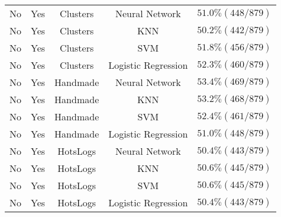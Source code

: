 \documentclass[11pt,letterpaper]{article}
\begin{document}
\begin{tabular}{c|c|c|c|c}
No & Yes & Clusters & Neural Network & $51.0\% (448/879)$ \\
No & Yes & Clusters & KNN & $50.2\% (442/879)$ \\
No & Yes &Clusters& SVM & $51.8\% (456/879)$ \\
No & Yes & Clusters & Logistic Regression & $52.3\% (460/879)$ \\

No & Yes & Handmade & Neural Network & $53.4\% (469/879)$ \\
No & Yes & Handmade & KNN & $53.2\% (468/879)$ \\
No & Yes & Handmade & SVM & $52.4\% (461/879)$ \\
No & Yes & Handmade & Logistic Regression & $51.0\% (448/879)$ \\

No & Yes & HotsLogs & Neural Network & $50.4\% (443/879)$ \\
No & Yes & HotsLogs & KNN & $50.6\% (445/879)$ \\
No & Yes & HotsLogs & SVM & $50.6\% (445/879)$ \\
No & Yes & HotsLogs & Logistic Regression & $50.4\% (443/879)$ \\
\end{tabular}
\end{document}
